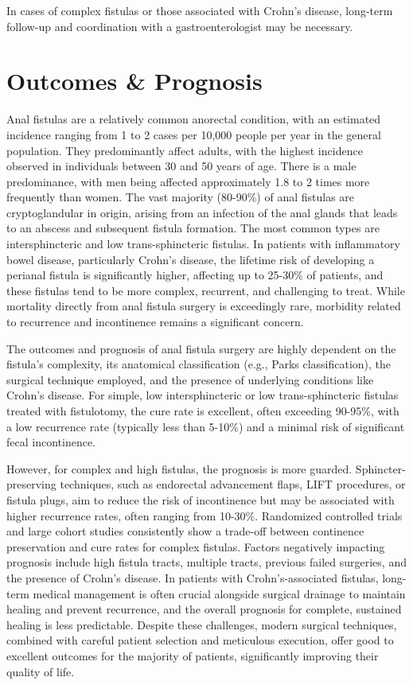 In cases of complex fistulas or those associated with Crohn's disease, long-term follow-up and coordination with a gastroenterologist may be necessary.

\section*{Outcomes \& Prognosis}
Anal fistulas are a relatively common anorectal condition, with an estimated incidence ranging from 1 to 2 cases per 10,000 people per year in the general population. They predominantly affect adults, with the highest incidence observed in individuals between 30 and 50 years of age. There is a male predominance, with men being affected approximately 1.8 to 2 times more frequently than women. The vast majority (80-90\%) of anal fistulas are cryptoglandular in origin, arising from an infection of the anal glands that leads to an abscess and subsequent fistula formation. The most common types are intersphincteric and low trans-sphincteric fistulas. In patients with inflammatory bowel disease, particularly Crohn's disease, the lifetime risk of developing a perianal fistula is significantly higher, affecting up to 25-30\% of patients, and these fistulas tend to be more complex, recurrent, and challenging to treat. While mortality directly from anal fistula surgery is exceedingly rare, morbidity related to recurrence and incontinence remains a significant concern.

The outcomes and prognosis of anal fistula surgery are highly dependent on the fistula's complexity, its anatomical classification (e.g., Parks classification), the surgical technique employed, and the presence of underlying conditions like Crohn's disease. For simple, low intersphincteric or low trans-sphincteric fistulas treated with fistulotomy, the cure rate is excellent, often exceeding 90-95\%, with a low recurrence rate (typically less than 5-10\%) and a minimal risk of significant fecal incontinence.

However, for complex and high fistulas, the prognosis is more guarded. Sphincter-preserving techniques, such as endorectal advancement flaps, LIFT procedures, or fistula plugs, aim to reduce the risk of incontinence but may be associated with higher recurrence rates, often ranging from 10-30\%. Randomized controlled trials and large cohort studies consistently show a trade-off between continence preservation and cure rates for complex fistulas. Factors negatively impacting prognosis include high fistula tracts, multiple tracts, previous failed surgeries, and the presence of Crohn's disease. In patients with Crohn's-associated fistulas, long-term medical management is often crucial alongside surgical drainage to maintain healing and prevent recurrence, and the overall prognosis for complete, sustained healing is less predictable. Despite these challenges, modern surgical techniques, combined with careful patient selection and meticulous execution, offer good to excellent outcomes for the majority of patients, significantly improving their quality of life.

